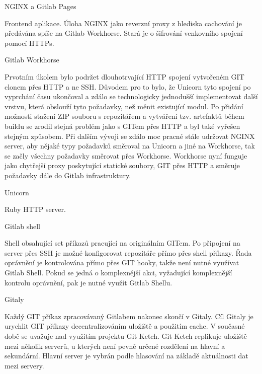\secc NGINX a Gitlab Pages

Frontend aplikace. Úloha NGINX jako reverzní proxy z hlediska cachování je předávána spíše na Gitlab Workhorse.
Stará je o šifrování venkovního spojení pomocí HTTPs.

\secc Gitlab Workhorse

Prvotním úkolem bylo podržet dlouhotrvající HTTP spojení vytvořeném GIT clonem přes HTTP a ne SSH.
Důvodem pro to bylo, že Unicorn tyto spojení po vyprchání času ukončoval a zdálo se technologicky jednodušší implementovat další vrstvu, která obslouží tyto požadavky, než měnit existující modul.
Po přidání možnosti stažení ZIP souboru s repozitářem a vytváření tzv. artefaktů během buildu se zrodil stejná problém jako s GITem přes HTTP a byl také vyřešen stejným způsobem.
Při dalším vývoji se zdálo moc pracné stále udržovat NGINX server, aby nějaké typy požadavků směroval na Unicorn a jiné na Workhorse, tak se začly všechny požadavky směrovat přes Workhorse.
Workhorse nyní funguje jako chytřejší proxy poskytující statické soubory, GIT přes HTTP a směruje požadavky dále do Gitlab infrastruktury.


\secc Unicorn

Ruby HTTP server.


\secc Gitlab shell

Shell obsahující set příkazů pracující na originálním GITem.
Po připojení na server přes SSH je možné konfigorovat repozitáře přímo přes shell příkazy.
Řada oprávnění je kontrolována přímo přes GIT hooky, takže není nutné využívat Gitlab Shell.
Pokud se jedná o komplexnější akci, vyžadující komplexnější kontrolu oprávnění, pak je nutné využít Gitlab Shellu.


\secc Gitaly

Každý GIT příkaz zpracovávaný Gitlabem nakonec skončí v Gitaly.
Cíl Gitaly je urychlit GIT příkazy decentralizováním uložiště a použitím cache.
V současné době se uvažuje nad využitím projektu Git Ketch.
Git Ketch replikuje uložiště mezi několik serverů, u kterých není pevně určené rozdělení na hlavní a sekundární.
Hlavní server je vybrán podle hlasování na základě aktuálnosti dat mezi servery.


